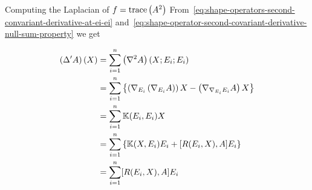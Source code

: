 \begin{frame}[allowframebreaks]{Computing the Laplacian of \(f=\text{trace}\left({A^{2}}\right)\)}
  From~\eqref{eq:shape-operators-second-convariant-derivative-at-ei-ei}
  and~\eqref{eq:shape-operator-second-covariant-derivative-null-sum-property}
  we get

  \framebreak 

  \begin{equation}\label{eq:formula-for-the-restricted-laplacian-of-A}
    \begin{split}
      \left(\Delta'{A}\right)(X) & = \sum_{i=1}^{n}\left(\nabla^{2}A\right)(X;E_{i};E_{i})                                                                                                    \\
                                              & =\sum_{i=1}^{n}\left\{\left(\nabla_{E_{i}}\left(\nabla_{E_{i}}A\right)\right)X-\left(\nabla_{\nabla_{E_{i}}E_{i}}A\right)X\right\} \\
                                              & =\sum_{i=1}^{n}\mathbb{K}(E_{i},E_{i})X                                                                                              \\
                                              & =\sum_{i=1}^{n}\left\{\mathbb{K}(X,E_{i})E_{i}+[R(E_{i},X),A]E_{i}\right\}                                                           \\
                                              & =\sum_{i=1}^{n}[R(E_{i},X),A]E_{i}
    \end{split}
  \end{equation}
  
\end{frame}
